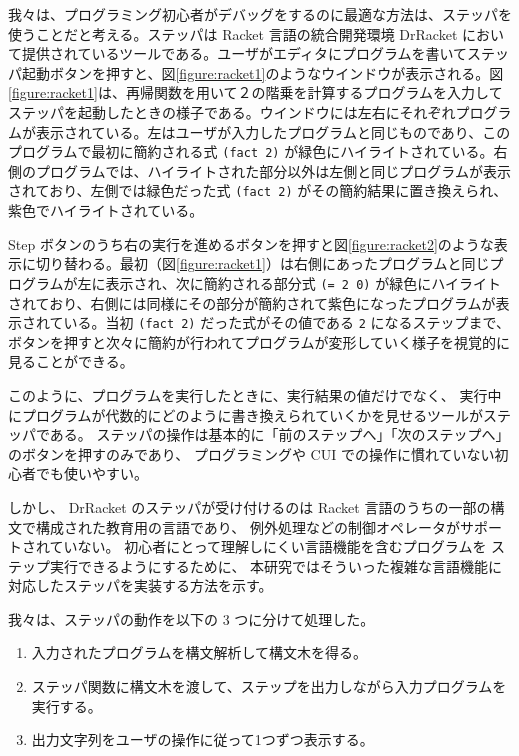 我々は、プログラミング初心者がデバッグをするのに最適な方法は、ステッパを使うことだと考える。ステッパは Racket 言語の統合開発環境 DrRacket において提供されているツール\cite{clements01}である。ユーザがエディタにプログラムを書いてステッパ起動ボタンを押すと、図\ref{figure:racket1}のようなウインドウが表示される。図\ref{figure:racket1}は、再帰関数を用いて２の階乗を計算するプログラムを入力してステッパを起動したときの様子である。ウインドウには左右にそれぞれプログラムが表示されている。左はユーザが入力したプログラムと同じものであり、このプログラムで最初に簡約される式 \texttt{(fact 2)} が緑色にハイライトされている。右側のプログラムでは、ハイライトされた部分以外は左側と同じプログラムが表示されており、左側では緑色だった式 \texttt{(fact 2)} がその簡約結果に置き換えられ、紫色でハイライトされている。

Step ボタンのうち右の実行を進めるボタンを押すと図\ref{figure:racket2}のような表示に切り替わる。最初（図\ref{figure:racket1}）は右側にあったプログラムと同じプログラムが左に表示され、次に簡約される部分式 \texttt{(= 2 0)} が緑色にハイライトされており、右側には同様にその部分が簡約されて紫色になったプログラムが表示されている。当初 \texttt{(fact 2)} だった式がその値である \texttt{2} になるステップまで、ボタンを押すと次々に簡約が行われてプログラムが変形していく様子を視覚的に見ることができる。

このように、プログラムを実行したときに、実行結果の値だけでなく、
実行中にプログラムが代数的にどのように書き換えられていくかを見せるツールがステッパである。
ステッパの操作は基本的に「前のステップへ」「次のステップへ」のボタンを押すのみであり、
プログラミングや CUI での操作に慣れていない初心者でも使いやすい。

しかし、
DrRacket のステッパが受け付けるのは Racket 言語のうちの一部の構文で構成された教育用の言語であり、
例外処理などの制御オペレータがサポートされていない。
初心者にとって理解しにくい言語機能を含むプログラムを
ステップ実行できるようにするために、
本研究ではそういった複雑な言語機能に対応したステッパを実装する方法を示す。

我々は、ステッパの動作を以下の 3 つに分けて処理した。

\begin{enumerate}
\item 入力されたプログラムを構文解析して構文木を得る。
\item ステッパ関数に構文木を渡して、ステップを出力しながら入力プログラムを実行する。
\item 出力文字列をユーザの操作に従って1つずつ表示する。
\end{enumerate}

